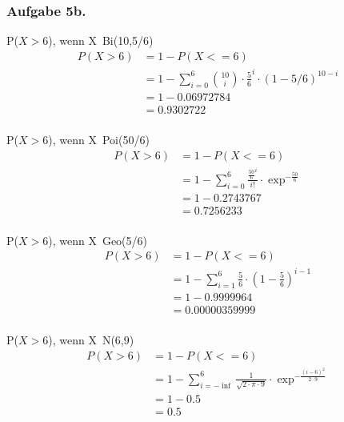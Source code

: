 \documentclass[a4paper,12pt]{article}
\newcommand{\ex}[1]{\newpage\subsubsection*{Aufgabe #1.}}
\begin{document}
	\ex{5b}

	P($X > 6$), wenn  X~Bi(10,5/6)\\
	\begin{align*}
	P(X > 6) &=1- P(X <= 6)\\
			 &= 1- \sum_{i=0}^{6} \binom{10}{i} \cdot \frac{5}{6}^{i} \cdot (1-5/6)^{10-i}\\
			 &= 1- 0.06972784\\
			 &= 0.9302722\\
	\end{align*}
	
	P($X > 6$), wenn  X~Poi(50/6)\\
	\begin{align*}
	P(X > 6) &=1- P(X <= 6)\\
	&= 1- \sum_{i=0}^{6} \frac{\frac{50}{6}^{i}}{i!} \cdot \exp^{-\frac{50}{6}} \\
	&= 1- 0.2743767 \\
	&= 0.7256233\\
	\end{align*}
	
	P($X > 6$), wenn  X~Geo(5/6)\\
	\begin{align*}
	P(X > 6) &=1- P(X <= 6)\\
	&= 1- \sum_{i=1}^{6} \frac{5}{6} \cdot (1-\frac{5}{6})^{i-1}\\ 
	&= 1- 0.9999964 \\
	&= 0.00000359999\\
	\end{align*}
	
	P($X > 6$), wenn  X~N(6,9)\\
	\begin{align*}
	P(X > 6) &=1- P(X <= 6)\\
	&= 1- \sum_{i=- \inf}^{6} \frac{1}{\sqrt{2 \cdot \pi \cdot 9}} \cdot \exp^{-\frac{(i-6)^{2}}{2 \cdot 9}}  \\
	&= 1- 0.5 \\
	&= 0.5\\
	\end{align*}
	
\end{document}
